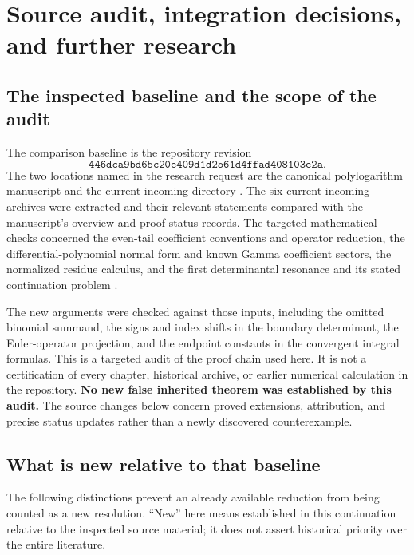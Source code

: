 \section{Source audit, integration decisions, and further research}
\label{audit:integration-section}

\subsection{The inspected baseline and the scope of the audit}
\label{audit:baseline}

The comparison baseline is the repository revision
\[
 \texttt{446dca9bd65c20e409d1d2561d4ffad408103e2a}.
\]
The two locations named in the research request are the canonical
polylogarithm manuscript and the current incoming directory
\cite{Repo,Incoming}. The six current incoming archives were extracted
and their relevant statements compared with the manuscript's overview
and proof-status records. The targeted mathematical checks concerned
the even-tail coefficient conventions and operator reduction, the
differential-polynomial normal form and known Gamma coefficient sectors,
the normalized residue calculus, and the first determinantal resonance
and its stated continuation problem \cite{DPL,PTI,BTD,DHR}.

The new arguments were checked against those inputs, including the
omitted binomial summand, the signs and index shifts in the boundary
determinant, the Euler-operator projection, and the endpoint constants
in the convergent integral formulas. This is a targeted audit of the
proof chain used here. It is not a certification of every chapter,
historical archive, or earlier numerical calculation in the repository.
\textbf{No new false inherited theorem was established by this audit.}
The source changes below concern proved extensions, attribution, and
precise status updates rather than a newly discovered counterexample.

\subsection{What is new relative to that baseline}
\label{audit:status-matrix}

The following distinctions prevent an already available reduction from
being counted as a new resolution. ``New'' here means established in
this continuation relative to the inspected source material; it does
not assert historical priority over the entire literature.


